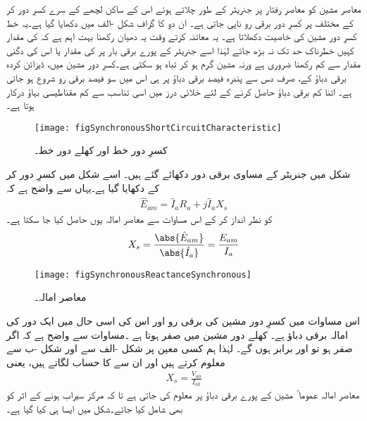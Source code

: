 معاصر مشین کو معاصر رفتار پر جنریٹر کے طور چلاتے ہوئے اس کے ساکن لچھے کے سِرے کسرِ دور کر کے مختلف  پر کسرِ دور برقی رو  ناپی جاتی ہے۔ ان دو کا گراف شکل -الف میں دکھایا گیا ہے۔یہ خط کسرِ دور مشین کی خاصیت دکھلاتا ہے۔  یہ معائنہ کرتے وقت یہ دھیان رکھنا بہت اہم ہے کہ  کی مقدار کہیں خطرناک حد تک نہ بڑھ جائے لہٰذا اسے جنریٹر کے پورے برقی بار پر  کی مقدار  یا اس کی دگنی مقدار سے کم رکھنا ضروری ہے ورنہ مشین گرم ہو کر تباہ ہو سکتی ہے۔کسرِ دور مشین میں، ڈیزائن کردہ برقی دباؤ کے، صرف دس سے پندرہ فیصد برقی دباؤ پر ہی اس میں سو فیصد برقی رو شروع ہو جاتی ہے۔ اتنا کم برقی دباؤ حاصل کرنے کے لئے خلائی درز میں اسی تناسب سے  کم مقناطیسی بہاؤ درکار ہوتا ہے۔ 
\begin{figure}
\centering
\texttt{[image: figSynchronousShortCircuitCharacteristic]}
\caption{کسرِ دور خط اور کھلے دور خط۔}
\label{شکل_معاصر_کسر_دور_اور_کھلے_دور_خط}
\end{figure}

شکل   میں جنریٹر کے مساوی برقی دور دکھائے گئے ہیں۔ اسے شکل   میں کسرِ دور کر کے دکھایا گیا ہے۔یہاں سے واضح ہے کہ
\begin{align}
\hat{E}_{am}=\hat{I}_a R_a+j \hat{I}_a X_s
\end{align}
 کو نظر انداز کر کے اس مساوات سے معاصر امالہ یوں حاصل کیا جا سکتا ہے۔
\begin{align}
X_s=\frac{\abs{\hat{E}_{am}}}{\abs{\hat{I}_a}}=\frac{E_{am}}{I_a}
\end{align}
%
\begin{figure}
\centering
\texttt{[image: figSynchronousReactanceSynchronous]}
\caption{معاصر امالہ۔}
\label{شکل_معاصر_امالہ_معاصر}
\end{figure}
اس مساوات میں  کسرِ دور مشین کی برقی رو اور  اس کی اسی حال میں ایک دور کی امالہ برقی دباؤ ہے۔ کھلے دور مشین میں  صفر ہوتا ہے ۔مساوات سے واضح ہے کہ اگر  صفر ہو تو   اور  برابر ہوں گے۔ لہٰذا ہم کسی معین  پر شکل -الف سے   اور شکل -ب سے  معلوم کرتے ہیں اور ان سے  کا حساب لگاتے ہیں، یعنی
\begin{align}
X_s=\frac{V_{a0}}{I_{a0}}
\end{align}
معاصر امالہ عموما ً مشین کے پورے برقی دباؤ پر معلوم کی جاتی ہے تا کہ مرکز سیراب ہونے کے اثر کو بھی شامل کیا جائے۔شکل میں ایسا ہی کیا گیا ہے۔

